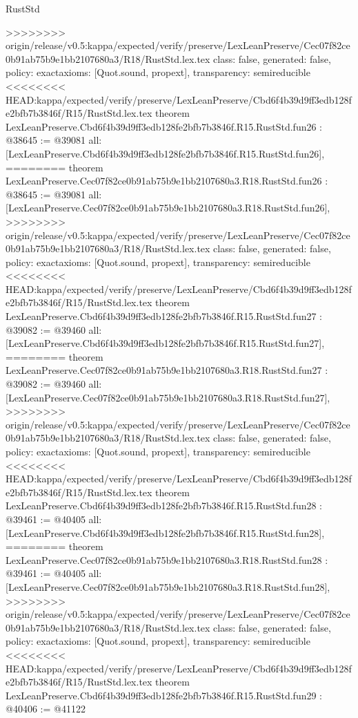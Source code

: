 \begin{lexlean}{RustStd}
\begin{coremodule}
{\begin{coremodule}
{{{{{{{{{{{{{{{{{{{{{{{{{{{{{>>>>>>>> origin/release/v0.5:kappa/expected/verify/preserve/LexLeanPreserve/Cec07f82ce0b91ab75b9e1bb2107680a3/R18/RustStd.lex.tex
  class: false,
  generated: false,
  policy: exact{axioms: [Quot.sound, propext]},
  transparency: semireducible
}
<<<<<<<< HEAD:kappa/expected/verify/preserve/LexLeanPreserve/Cbd6f4b39d9ff3edb128fe2bfb7b3846f/R15/RustStd.lex.tex
theorem LexLeanPreserve.Cbd6f4b39d9ff3edb128fe2bfb7b3846f.R15.RustStd.fun26 : @38645 := @39081 {
  all: [LexLeanPreserve.Cbd6f4b39d9ff3edb128fe2bfb7b3846f.R15.RustStd.fun26],
========
theorem LexLeanPreserve.Cec07f82ce0b91ab75b9e1bb2107680a3.R18.RustStd.fun26 : @38645 := @39081 {
  all: [LexLeanPreserve.Cec07f82ce0b91ab75b9e1bb2107680a3.R18.RustStd.fun26],
>>>>>>>> origin/release/v0.5:kappa/expected/verify/preserve/LexLeanPreserve/Cec07f82ce0b91ab75b9e1bb2107680a3/R18/RustStd.lex.tex
  class: false,
  generated: false,
  policy: exact{axioms: [Quot.sound, propext]},
  transparency: semireducible
}
<<<<<<<< HEAD:kappa/expected/verify/preserve/LexLeanPreserve/Cbd6f4b39d9ff3edb128fe2bfb7b3846f/R15/RustStd.lex.tex
theorem LexLeanPreserve.Cbd6f4b39d9ff3edb128fe2bfb7b3846f.R15.RustStd.fun27 : @39082 := @39460 {
  all: [LexLeanPreserve.Cbd6f4b39d9ff3edb128fe2bfb7b3846f.R15.RustStd.fun27],
========
theorem LexLeanPreserve.Cec07f82ce0b91ab75b9e1bb2107680a3.R18.RustStd.fun27 : @39082 := @39460 {
  all: [LexLeanPreserve.Cec07f82ce0b91ab75b9e1bb2107680a3.R18.RustStd.fun27],
>>>>>>>> origin/release/v0.5:kappa/expected/verify/preserve/LexLeanPreserve/Cec07f82ce0b91ab75b9e1bb2107680a3/R18/RustStd.lex.tex
  class: false,
  generated: false,
  policy: exact{axioms: [Quot.sound, propext]},
  transparency: semireducible
}
<<<<<<<< HEAD:kappa/expected/verify/preserve/LexLeanPreserve/Cbd6f4b39d9ff3edb128fe2bfb7b3846f/R15/RustStd.lex.tex
theorem LexLeanPreserve.Cbd6f4b39d9ff3edb128fe2bfb7b3846f.R15.RustStd.fun28 : @39461 := @40405 {
  all: [LexLeanPreserve.Cbd6f4b39d9ff3edb128fe2bfb7b3846f.R15.RustStd.fun28],
========
theorem LexLeanPreserve.Cec07f82ce0b91ab75b9e1bb2107680a3.R18.RustStd.fun28 : @39461 := @40405 {
  all: [LexLeanPreserve.Cec07f82ce0b91ab75b9e1bb2107680a3.R18.RustStd.fun28],
>>>>>>>> origin/release/v0.5:kappa/expected/verify/preserve/LexLeanPreserve/Cec07f82ce0b91ab75b9e1bb2107680a3/R18/RustStd.lex.tex
  class: false,
  generated: false,
  policy: exact{axioms: [Quot.sound, propext]},
  transparency: semireducible
}
<<<<<<<< HEAD:kappa/expected/verify/preserve/LexLeanPreserve/Cbd6f4b39d9ff3edb128fe2bfb7b3846f/R15/RustStd.lex.tex
theorem LexLeanPreserve.Cbd6f4b39d9ff3edb128fe2bfb7b3846f.R15.RustStd.fun29 : @40406 := @41122 {
}}}}}}}}}}}}}}}}}}}}}}}}}}}}}}}}
\end{coremodule}}
\end{coremodule}
\end{lexlean}
